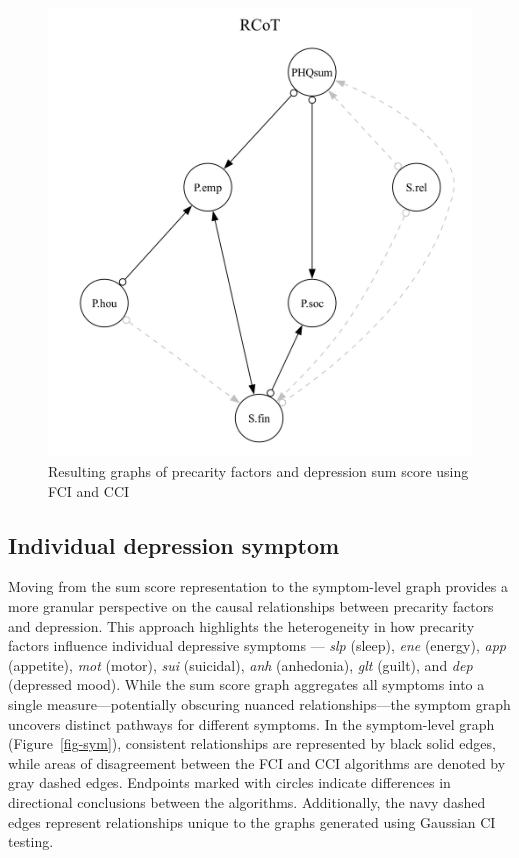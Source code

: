 \documentclass[
]{article}
\begin{document}
\begin{figure}
\begin{minipage}{0.50\linewidth}
{\includegraphics[width=1\textwidth,height=\textheight]{img/rcot_dot.png}

}


\end{minipage}%

\caption{\label{fig-sum}Resulting graphs of precarity factors and
depression sum score using FCI and CCI}

\end{figure}%

\subsection{Individual depression
symptom}\label{individual-depression-symptom}

Moving from the sum score representation to the symptom-level graph
provides a more granular perspective on the causal relationships between
precarity factors and depression. This approach highlights the
heterogeneity in how precarity factors influence individual depressive
symptoms --- \emph{slp} (sleep), \emph{ene} (energy), \emph{app}
(appetite), \emph{mot} (motor), \emph{sui} (suicidal), \emph{anh}
(anhedonia), \emph{glt} (guilt), and \emph{dep} (depressed mood). While
the sum score graph aggregates all symptoms into a single
measure---potentially obscuring nuanced relationships---the symptom
graph uncovers distinct pathways for different symptoms. In the
symptom-level graph (Figure~\ref{fig-sym}), consistent relationships are
represented by black solid edges, while areas of disagreement between
the FCI and CCI algorithms are denoted by gray dashed edges. Endpoints
marked with circles indicate differences in directional conclusions
between the algorithms. Additionally, the navy dashed edges represent
relationships unique to the graphs generated using Gaussian CI testing.
\end{document}
